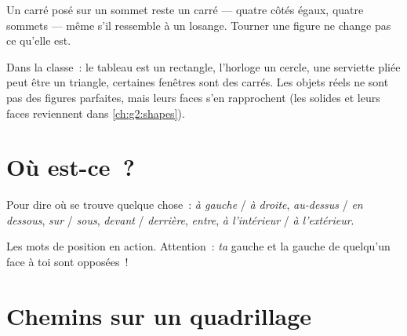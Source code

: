 \begin{example}\label{ex:g1:shapes:tilted}
Un carré posé sur un sommet reste un carré --- quatre côtés
égaux, quatre sommets --- même s'il ressemble à un losange.
Tourner une figure ne change pas ce qu'elle est.
\end{example}

\begin{example}\label{ex:g1:shapes:hunt}
Dans la classe~: le tableau est un rectangle, l'horloge un cercle,
une serviette pliée peut être un triangle, certaines fenêtres
sont des carrés. Les objets réels ne sont pas des figures
parfaites, mais leurs faces s'en rapprochent (les solides et leurs
faces reviennent dans \cref{ch:g2:shapes}).
\end{example}

\section{Où est-ce~?}

\begin{definition}\label{def:g1:shapes:position}
Pour dire où se trouve quelque chose~: \emph{à gauche} /
\emph{à droite}, \emph{au-dessus} / \emph{en dessous},
\emph{sur} / \emph{sous}, \emph{devant} / \emph{derrière},
\emph{entre}, \emph{à l'intérieur} / \emph{à l'extérieur}.
\end{definition}

\begin{omfigure}

{\small Les mots de position en action. Attention~: \emph{ta} gauche
et la gauche de quelqu'un face à toi sont opposées~!}
\end{omfigure}

\section{Chemins sur un quadrillage}

